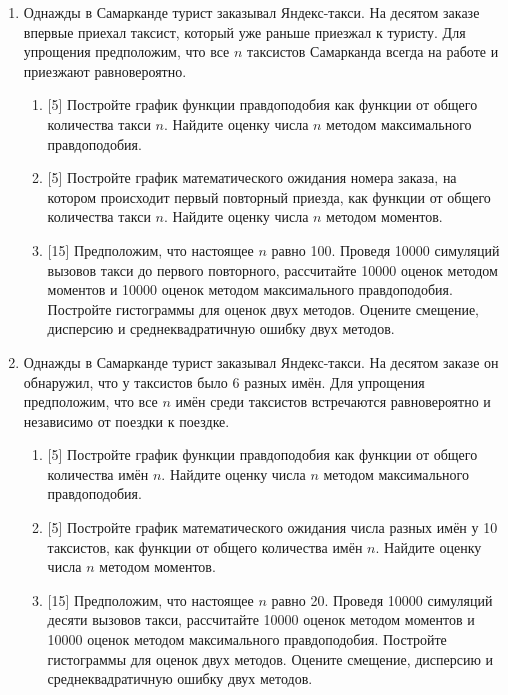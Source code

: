 \documentclass[12pt]{article} %
\begin{document}
\begin{enumerate}

    \item Однажды в Самарканде турист заказывал Яндекс-такси. 
    На десятом заказе впервые приехал таксист, который уже раньше приезжал к туристу. 
    Для упрощения предположим, что все $n$ таксистов Самарканда всегда на работе и приезжают равновероятно.

    \begin{enumerate}
      \item {[5]} Постройте график функции правдоподобия как функции от общего количества такси $n$. 
      Найдите оценку числа $n$ методом максимального правдоподобия. 
      \item {[5]} Постройте график математического ожидания номера заказа, 
      на котором происходит первый повторный приезда, как функции от общего количества такси $n$. 
      Найдите оценку числа $n$ методом моментов.
      \item {[15]} Предположим, что настоящее $n$ равно 100. 
      Проведя 10000 симуляций вызовов такси до первого повторного, рассчитайте 10000 оценок методом моментов и 10000 оценок методом максимального правдоподобия. 
      Постройте гистограммы для оценок двух методов. 
      Оцените смещение, дисперсию и среднеквадратичную ошибку двух методов. 
    \end{enumerate}

    \item Однажды в Самарканде турист заказывал Яндекс-такси. 
    На десятом заказе он обнаружил, что у таксистов было 6 разных имён.
    Для упрощения предположим, что все $n$ имён среди таксистов встречаются равновероятно и независимо от 
    поездки к поездке. 

    \begin{enumerate}
      \item {[5]} Постройте график функции правдоподобия как функции от общего количества имён $n$. 
      Найдите оценку числа $n$ методом максимального правдоподобия. 
      \item {[5]} Постройте график математического ожидания числа разных имён у 10 таксистов, 
      как функции от общего количества имён $n$. 
      Найдите оценку числа $n$ методом моментов.
      \item {[15]} Предположим, что настоящее $n$ равно 20. 
      Проведя 10000 симуляций десяти вызовов такси, рассчитайте 10000 оценок методом моментов и 10000 оценок методом максимального правдоподобия. 
      Постройте гистограммы для оценок двух методов. 
      Оцените смещение, дисперсию и среднеквадратичную ошибку двух методов. 


\end{enumerate}
\end{enumerate}
\end{document}
